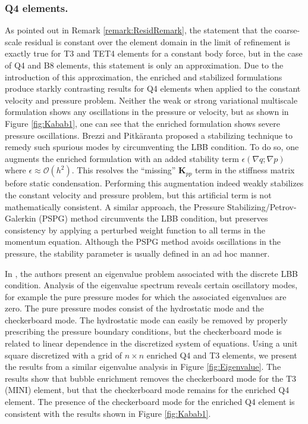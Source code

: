 \documentclass[11pt]{amsart}
\begin{document}
\subsubsection{Q4 elements.}
As pointed out in Remark \ref{remark:ResidRemark}, the statement that the coarse-scale residual is constant over the element domain in the limit of refinement is exactly true for T3 and TET4 elements for a constant body force, but in the case of Q4 and B8 elements, this statement is only an approximation.  Due to the introduction of this approximation, the enriched and stabilized formulations produce starkly contrasting results for Q4 elements when applied to the constant velocity and pressure problem.  Neither the weak or strong variational multiscale formulation shows any oscillations in the pressure or velocity, but as shown in Figure \ref{fig:Kabab1}, one can see that the enriched formulation shows severe pressure oscillations.
Brezzi and Pitk\"{a}ranta \cite{Mulder} proposed a stabilizing technique to remedy such spurious modes by circumventing the LBB condition.  To do so, one augments the enriched formulation with an added stability term $\epsilon(\nabla q;\nabla p)$ where $\epsilon \approx \mathcal{O}(h^2)$.  This resolves the ``missing'' $\boldsymbol{K}_{pp}$ term in the stiffness matrix before static condensation.  Performing this augmentation indeed weakly stabilizes the constant velocity and pressure problem, but this artificial term is not mathematically consistent.  A similar approach, the Pressure Stabilizing/Petrov-Galerkin (PSPG) method \cite{PSPG} circumvents the LBB condition, but preserves consistency by applying a perturbed weight function to all terms in the momentum equation.  Although the PSPG method avoids oscillations in the pressure, the stability parameter is usually defined in an ad hoc manner.

In \cite{Malkus, Griffiths, Gresho, Sani}, the authors present an eigenvalue problem associated with the discrete LBB condition.  Analysis of the eigenvalue spectrum reveals certain oscillatory modes, for example the pure pressure modes for which the associated eigenvalues are zero.  The pure pressure modes consist of the hydrostatic mode and the checkerboard mode.  The hydrostatic mode can easily be removed by properly prescribing the pressure boundary conditions, but the checkerboard mode is related to linear dependence in the discretized system of equations. Using a unit square discretized with a grid of $n \times n$ enriched Q4 and T3 elements, we present the results from a similar eigenvalue analysis in Figure \ref{fig:Eigenvalue}.  The results show that bubble enrichment removes the checkerboard mode for the T3 (MINI) element, but that the checkerboard mode remains for the enriched Q4 element.  The presence of the checkerboard mode for the enriched Q4 element is consistent with the results shown in Figure \ref{fig:Kabab1}.
\end{document}
